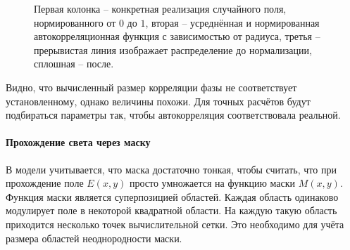 \begin{figure}[htbp]
	\caption{Первая колонка -- конкретная реализация случайного поля, нормированного от $0$ до $1$, вторая -- усреднённая и нормированная автокорреляционная функция с зависимостью от радиуса, третья -- прерывистая линия изображает распределение до нормализации, сплошная -- после.}
	\label{ris:IncoherentRAD}
\end{figure}
Видно, что вычисленный размер корреляции фазы не соответствует установленному, однако величины похожи. Для точных расчётов будут подбираться параметры так, чтобы автокорреляция соответствовала реальной.


\paragraph{Прохождение света через маску}
В модели учитывается, что маска достаточно тонкая, чтобы считать, что при прохождение поле $E(x,y)$ просто умножается на функцию маски $M(x,y)$. Функция маски является суперпозицией областей. Каждая область одинаково модулирует поле в некоторой квадратной области. На каждую такую область приходится несколько точек вычислительной сетки. Это необходимо для учёта размера областей неоднородности маски.



